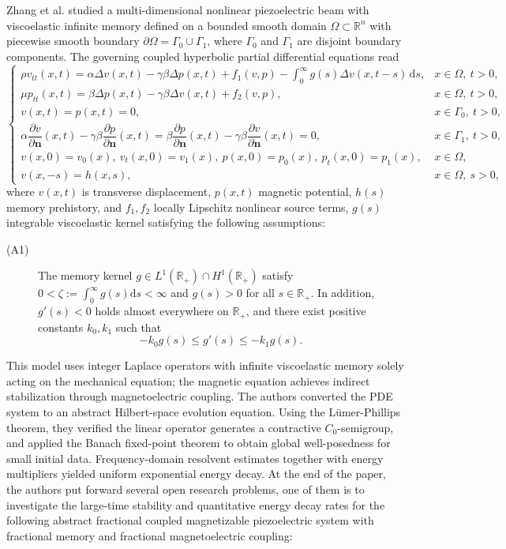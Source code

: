 \documentclass[12pt,reqno]{article}
\begin{document}
Zhang et al. \cite{MR4450079} studied a multi-dimensional nonlinear piezoelectric beam with viscoelastic infinite memory defined on a bounded smooth domain $\Omega \subset \mathbb{R}^n$ with piecewise smooth boundary $\partial\Omega = \Gamma_0 \cup \Gamma_1$, where $\Gamma_0$ and $\Gamma_1$ are disjoint boundary components. The governing coupled hyperbolic partial differential equations read
\begin{equation}\label{ZAMP-original}
\begin{cases}
\rho v_{tt}(x,t) = \alpha \Delta v(x,t) - \gamma\beta \Delta p(x,t) + f_1(v,p) - \displaystyle\int_{0}^{\infty} g(s)\Delta v(x,t-s)\,\mathrm{d}s, & x\in\Omega,\ t>0,\\
\mu p_{tt}(x,t) = \beta \Delta p(x,t) - \gamma\beta \Delta v(x,t) + f_2(v,p), & x\in\Omega,\ t>0,\\
v(x,t) = p(x,t) = 0, & x\in\Gamma_0,\ t>0,\\
\alpha \dfrac{\partial v}{\partial \mathbf{n}}(x,t) - \gamma\beta \dfrac{\partial p}{\partial \mathbf{n}}(x,t) = \beta \dfrac{\partial p}{\partial \mathbf{n}}(x,t) - \gamma\beta \dfrac{\partial v}{\partial \mathbf{n}}(x,t) = 0, & x\in\Gamma_1,\ t>0,\\
v(x,0) = v_0(x),\ v_t(x,0) = v_1(x),\ p(x,0) = p_0(x),\ p_t(x,0) = p_1(x), & x\in\Omega,\\
v(x,-s) = h(x,s), & x\in\Omega,\ s>0,
\end{cases}
\end{equation}
where $v(x,t)$ is transverse displacement, $p(x,t)$ magnetic potential, $h(s)$ memory prehistory, and $f_1,f_2$ locally Lipschitz nonlinear source terms, $g(s)$ integrable viscoelastic kernel satisfying the following assumptions:
 \begin{description}
		\item[(A1)]
	The memory kernel $g\in L^1(\mathbb{R}_+)\cap H^1(\mathbb{R}_+)$ satisfy $0<\zeta:=\int_0^\infty g(s)\mathrm{d}s<\infty$ and $g(s)>0$ for all $s\in\mathbb{R}_+$. In addition, $g'(s)<0$ holds almost everywhere on $\mathbb{R}_+$, and there exist positive constants $k_0,k_1$ such that
		\[
		-k_0 g(s)\leq g'(s)\leq -k_1 g(s).
		\]
		\end{description}
This model uses integer Laplace operators with infinite viscoelastic memory solely acting on the mechanical equation; the magnetic equation achieves indirect stabilization through magnetoelectric coupling. The authors converted the PDE system to an abstract Hilbert-space evolution equation. Using the L\"umer-Phillips theorem, they verified the linear operator generates a contractive $C_0$-semigroup, and applied the Banach fixed-point theorem to obtain global well-posedness for small initial data. Frequency-domain resolvent estimates together with energy multipliers yielded uniform exponential energy decay. At the end of the paper, the authors put forward several open research problems, one of them is to investigate the large-time stability and quantitative energy decay rates for the following abstract fractional coupled magnetizable piezoelectric system with fractional memory and fractional magnetoelectric coupling:
\end{document}
